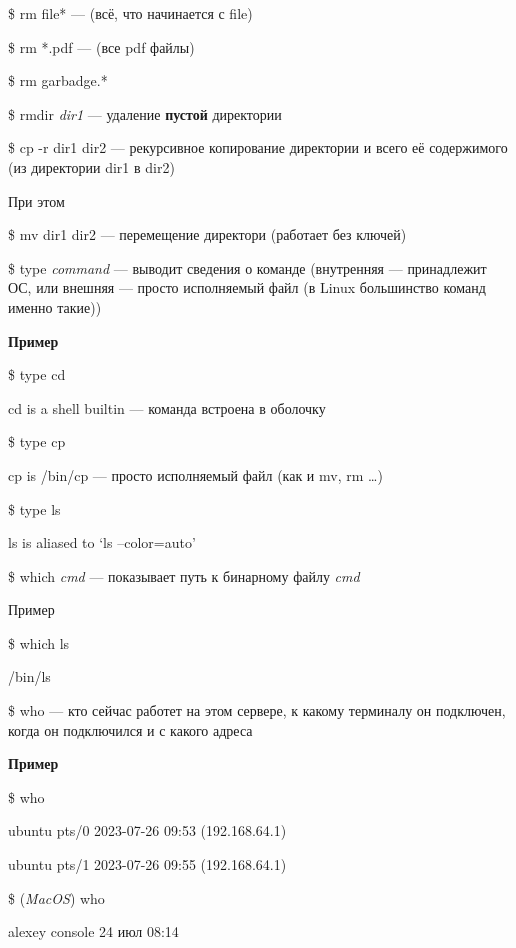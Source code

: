 \documentclass[oneside, final, 14pt]{extreport} %
\begin{document}
\$ rm file* --- (всё, что начинается с file)

\$ rm *.pdf --- (все pdf файлы)

\$ rm garbadge.*

\vspace{\baselineskip}

\$ rmdir \textit{dir1} --- удаление \textbf{пустой} директории

\$ cp -r dir1 dir2 --- рекурсивное копирование директории и всего её содержимого
(из директории dir1 в dir2)

При этом

\$ mv dir1 dir2 --- перемещение директори (работает без ключей)

\vspace{\baselineskip}

\$ type \textit{command} --- выводит сведения о команде (внутренняя --- принадлежит ОС,
или внешняя --- просто исполняемый файл (в Linux большинство команд именно такие))

\textbf{Пример}

\$ type cd 

cd is a shell builtin --- команда встроена в оболочку

\$ type cp

cp is /bin/cp --- просто исполняемый файл (как и mv, rm \dots)

\$ type ls

ls is aliased to `ls --color=auto'

\vspace{\baselineskip}

\$ which \textit{cmd} --- показывает путь к бинарному файлу \textit{cmd}

Пример

\$ which ls

/bin/ls

\vspace{\baselineskip}

\$ who --- кто сейчас работет на этом сервере, к какому терминалу он подключен, 
когда он подключился и с какого адреса

\textbf{Пример}

\$ who

ubuntu   pts/0        2023-07-26 09:53 (192.168.64.1)

ubuntu   pts/1        2023-07-26 09:55 (192.168.64.1)

\$ (\textit{MacOS}) who

alexey           console      24 июл 08:14 
\end{document}
